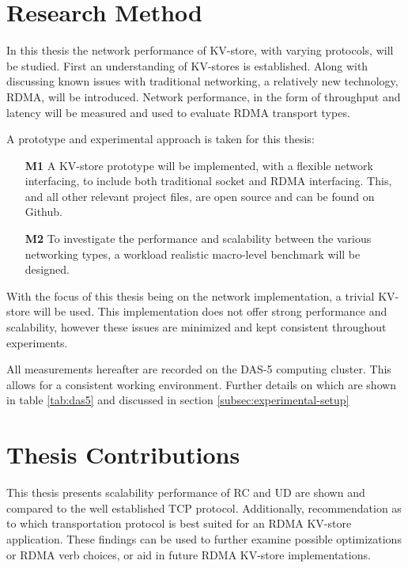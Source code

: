 \section{Research Method}
In this thesis the network performance of KV-store, with varying protocols, will be studied. 
First an understanding of KV-stores is established.
Along with discussing known issues with traditional networking, a relatively new technology, RDMA, will be introduced.
Network performance, in the form of throughput and latency will be measured and used to evaluate RDMA transport types.

A prototype\cite{iosup2019atlarge,hamming1998art,peffers2007design} and experimental\cite{jain1990art,heiser2010,ousterhout2018always} approach is taken for this thesis:
\begin{itemize}
    \item[\textbf{M1}] A KV-store prototype will be implemented, with a flexible network interfacing, to include both traditional socket and RDMA interfacing.
    This, and all other relevant project files, are open source and can be found on Github\cite{github}.
    \item[\textbf{M2}] To investigate the performance and scalability between the various networking types, a workload realistic\cite{atikoglu2012workload} macro-level benchmark will be designed.
\end{itemize}

With the focus of this thesis being on the network implementation, a trivial KV-store will be used.
This implementation does not offer strong performance and scalability, however these issues are minimized and kept consistent throughout experiments.

All measurements hereafter are recorded on the DAS-5 computing cluster.
This allows for a consistent working environment.
Further details on which are shown in table \ref{tab:das5} and discussed in section \ref{subsec:experimental-setup}

\section{Thesis Contributions}
This thesis presents scalability performance of RC and UD are shown and compared to the well established TCP protocol.
Additionally, recommendation as to which transportation protocol is best suited for an RDMA KV-store application.
These findings can be used to further examine possible optimizations or RDMA verb choices, or aid in future RDMA KV-store implementations.

